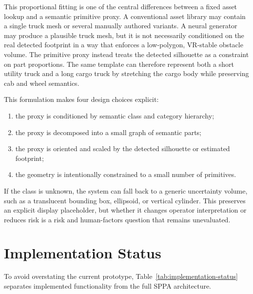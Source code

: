 ﻿\documentclass[11pt,a4paper]{article}
\begin{document}
This proportional fitting is one of the central differences between a fixed
asset lookup and a semantic primitive proxy. A conventional asset library may
contain a single truck mesh or several manually authored variants. A neural
generator may produce a plausible truck mesh, but it is not necessarily
conditioned on the real detected footprint in a way that enforces a
low-polygon, VR-stable obstacle volume. The primitive proxy instead treats the
detected silhouette as a constraint on part proportions. The same template can
therefore represent both a short utility truck and a long cargo truck by
stretching the cargo body while preserving cab and wheel semantics.

This formulation makes four design choices explicit:

\begin{enumerate}
    \item the proxy is conditioned by semantic class and category hierarchy;
    \item the proxy is decomposed into a small graph of semantic parts;
    \item the proxy is oriented and scaled by the detected silhouette or
    estimated footprint;
    \item the geometry is intentionally constrained to a small number of
    primitives.
\end{enumerate}

If the class is unknown, the system can fall back to a generic uncertainty
volume, such as a translucent bounding box, ellipsoid, or vertical cylinder.
This preserves an explicit display placeholder, but whether it changes
operator interpretation or reduces risk is a risk and human-factors question
that remains unevaluated.

\section{Implementation Status}

To avoid overstating the current prototype, Table~\ref{tab:implementation-status}
separates implemented functionality from the full SPPA architecture.
\end{document}
